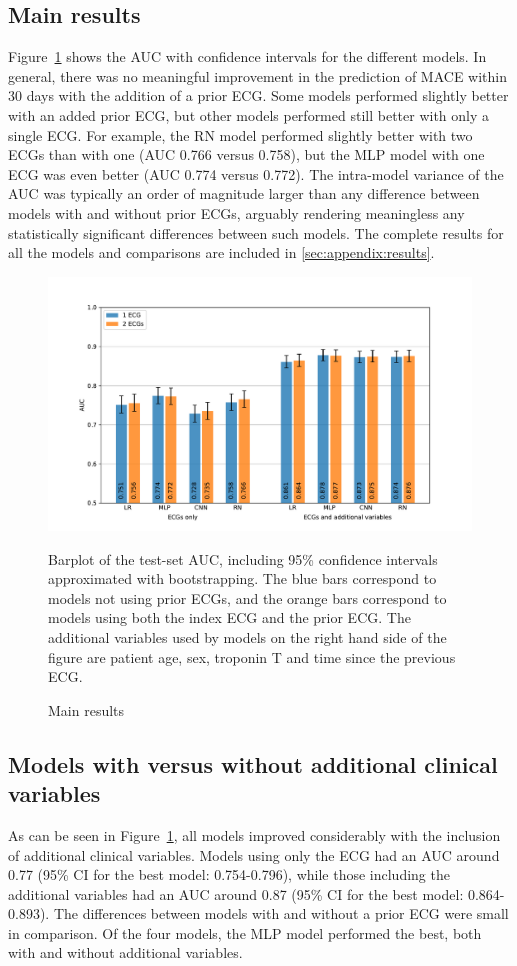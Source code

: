 \documentclass[preprint]{elsarticle}
\begin{document}
\subsection{Main results}
Figure~\ref{fig:mainresults} shows the AUC with confidence intervals for the different models. In general, there was no meaningful improvement in the prediction of MACE within 30 days with the addition of a prior ECG. Some models performed slightly better with an added prior ECG, but other models performed still better with only a single ECG. For example, the RN model performed slightly better with two ECGs than with one (AUC 0.766 versus 0.758), but the MLP model with one ECG was even better (AUC 0.774 versus 0.772). The intra-model variance of the AUC was typically an order of magnitude larger than any difference between models with and without prior ECGs, arguably rendering meaningless any statistically significant differences between such models. The complete results for all the models and comparisons are included in \ref{sec:appendix:results}. 

\begin{figure}[h!]
\includegraphics[width=\linewidth]{figures/main_results.pdf}
\caption{Main results}
\medskip
\small
Barplot of the test-set AUC, including 95\% confidence intervals approximated with bootstrapping. The blue bars correspond to models not using prior ECGs, and the orange bars correspond to models using both the index ECG and the prior ECG. The additional variables used by models on the right hand side of the figure are patient age, sex, troponin T and time since the previous ECG.
\label{fig:mainresults}
\end{figure}

\subsection{Models with versus without additional clinical variables}
As can be seen in Figure~\ref{fig:mainresults}, all models improved considerably with the inclusion of additional clinical variables. Models using only the ECG had an AUC around 0.77 (95\% CI for the best model: 0.754-0.796), while those including the additional variables had an AUC around 0.87 (95\% CI for the best model: 0.864-0.893). The differences between models with and without a prior ECG were small in comparison. Of the four models, the MLP model performed the best, both with and without additional variables.
\end{document}
